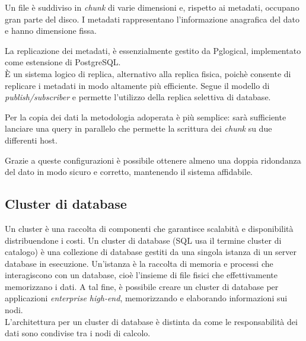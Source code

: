 Un file \`{e} suddiviso in \textit{chunk} di varie dimensioni e, rispetto ai metadati, occupano gran parte del disco. I metadati rappresentano l'informazione anagrafica del dato e hanno dimensione fissa.

La replicazione dei metadati, \`{e} essenzialmente gestito da Pglogical, implementato come estensione di PostgreSQL. \\
\`{E} un sistema logico di replica, alternativo alla replica fisica, poich\`{e} consente di replicare i metadati in modo altamente pi\`{u} efficiente. Segue il modello di \textit{publish/subscriber} e permette l'utilizzo della replica selettiva di database.

Per la copia dei dati la metodologia adoperata \`{e} pi\`{u} semplice: sar\`{a} sufficiente lanciare una query in parallelo che permette la scrittura dei \textit{chunk} su due differenti host.

Grazie a queste configurazioni \`{e} possibile ottenere almeno una doppia ridondanza del dato in modo sicuro e corretto, mantenendo il sistema affidabile.

\item
\subsection{Cluster di database}
Un cluster \`{e} una raccolta di componenti che garantisce scalabit\`{a} e disponibilit\`{a} distribuendone i costi. Un cluster di database (SQL usa il termine cluster di catalogo) \`{e} una collezione di database gestiti da una singola istanza di un server database in esecuzione. Un'istanza \`{e} la raccolta di memoria e processi che interagiscono con un database, cio\`{e} l'insieme di file fisici che effettivamente memorizzano i dati.\cite{etichetta1} A tal fine, \`{e} possibile creare un cluster di database per applicazioni \textit{enterprise high-end}, memorizzando e elaborando informazioni sui nodi.\\ L'architettura per un cluster di database \`{e} distinta da come le responsabilit\`{a} dei dati sono condivise tra i nodi di calcolo.


